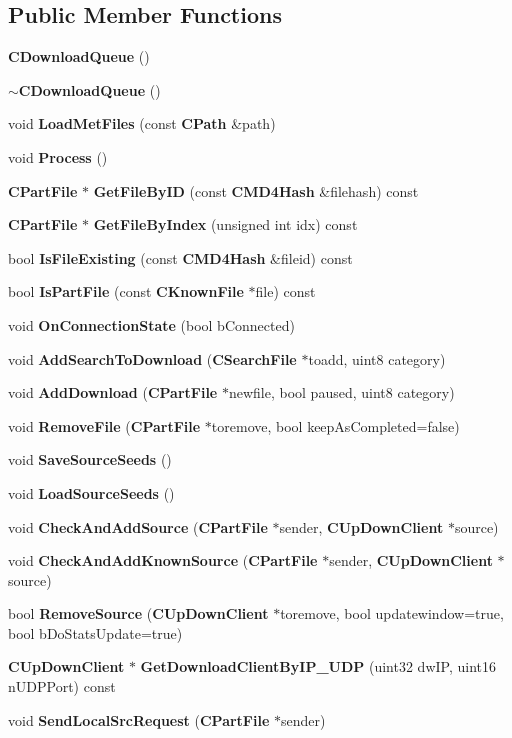 \subsection*{Public Member Functions}
\begin{DoxyCompactItemize}
\item 
{\bf CDownloadQueue} ()\label{classCDownloadQueue_a535b1da6bf45937c074861f453375a7f}

\item 
{\bf $\sim$CDownloadQueue} ()\label{classCDownloadQueue_a61d1eeaee70e0dc4be19460fd82fc544}

\item 
void {\bf LoadMetFiles} (const {\bf CPath} \&path)
\item 
void {\bf Process} ()\label{classCDownloadQueue_a8657754c2d6afcfd89375b4a4e857192}

\item 
{\bf CPartFile} $\ast$ {\bf GetFileByID} (const {\bf CMD4Hash} \&filehash) const 
\item 
{\bf CPartFile} $\ast$ {\bf GetFileByIndex} (unsigned int idx) const 
\item 
bool {\bf IsFileExisting} (const {\bf CMD4Hash} \&fileid) const \label{classCDownloadQueue_a69b08bfefe72205168ab14bf04e83690}

\item 
bool {\bf IsPartFile} (const {\bf CKnownFile} $\ast$file) const \label{classCDownloadQueue_a7ced3914956072120a4f1ce93aee2c05}

\item 
void {\bf OnConnectionState} (bool bConnected)\label{classCDownloadQueue_a066f4891c40f5f84a7ce5b90ddc48815}

\item 
void {\bf AddSearchToDownload} ({\bf CSearchFile} $\ast$toadd, uint8 category)
\item 
void {\bf AddDownload} ({\bf CPartFile} $\ast$newfile, bool paused, uint8 category)
\item 
void {\bf RemoveFile} ({\bf CPartFile} $\ast$toremove, bool keepAsCompleted=false)
\item 
void {\bf SaveSourceSeeds} ()\label{classCDownloadQueue_a5d0cba092b1ad93a9408df017c318046}

\item 
void {\bf LoadSourceSeeds} ()\label{classCDownloadQueue_ab7c309806762279f18f5f27b2762cabc}

\item 
void {\bf CheckAndAddSource} ({\bf CPartFile} $\ast$sender, {\bf CUpDownClient} $\ast$source)
\item 
void {\bf CheckAndAddKnownSource} ({\bf CPartFile} $\ast$sender, {\bf CUpDownClient} $\ast$source)
\item 
bool {\bf RemoveSource} ({\bf CUpDownClient} $\ast$toremove, bool updatewindow=true, bool bDoStatsUpdate=true)
\item 
{\bf CUpDownClient} $\ast$ {\bf GetDownloadClientByIP\_\-UDP} (uint32 dwIP, uint16 nUDPPort) const 
\item 
void {\bf SendLocalSrcRequest} ({\bf CPartFile} $\ast$sender)\label{classCDownloadQueue_a7107266ac67ab16fc698da12234ec208}


\end{DoxyCompactItemize}

